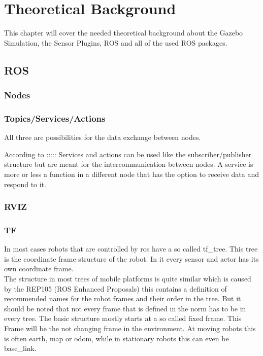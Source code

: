 \chapter{Theoretical Background}
\label{theoretical_background}
This chapter will cover the needed theoretical background about the Gazebo Simulation, the Sensor Plugins, ROS and all of the used ROS packages.

\section{ROS}



\subsection{Nodes}
\subsection{Topics/Services/Actions}
All three are possibilities for the data exchange between nodes.

According to :::::
Services and actions can be used like the subscriber/publisher structure but are meant for the intercommunication between nodes. A service is more or less a function in a different node that has the option to receive data and respond to it.
\subsection{RVIZ}
\subsection{TF}
In most cases robots that are controlled by ros have a so called tf\_tree. This tree is the coordinate frame structure of the robot. In it every sensor and actor has its own coordinate frame.\\
 The structure in most trees of mobile platforms is quite similar which is caused by the REP105 (ROS Enhanced Proposals) this contains a definition of recommended names for the robot frames and their order in the tree. But it should be noted that not every frame that is defined in the norm has to be in every tree. The basic structure mostly starts at a so called fixed frame. This Frame will be the not changing frame in the environment. At moving robots this is often earth, map or odom, while in stationary robots this can even be base\_link.\\
 

